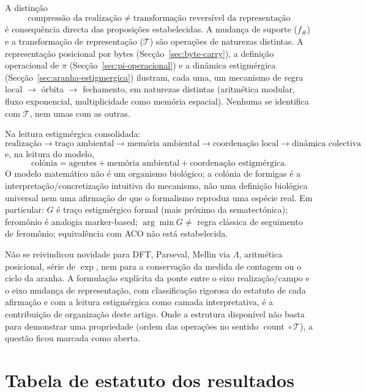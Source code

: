 \documentclass[11pt,a4paper]{article}
\begin{document}
A distinção
\[
\text{compressão da realização}
\;\neq\;
\text{transformação reversível da representação}
\]
é consequência directa das proposições estabelecidas. A mudança de suporte (\(f_{\#}\)) e a transformação de representação (\(\mathcal T\)) são operações de naturezas distintas. A representação posicional por bytes (Secção~\ref{sec:byte-carry}), a definição operacional de \(\pi\) (Secção~\ref{sec:pi-operacional}) e a dinâmica estigmérgica (Secção~\ref{sec:aranha-estigmergica}) ilustram, cada uma, um mecanismo de regra local \(\to\) órbita \(\to\) fechamento, em naturezas distintas (aritmética modular, fluxo exponencial, multiplicidade como memória espacial). Nenhuma se identifica com \(\mathcal T\), nem umas com as outras.

Na leitura estigmérgica consolidada:
\[
\boxed{\text{realização}\to\text{traço ambiental}\to\text{memória ambiental}\to\text{coordenação local}\to\text{dinâmica colectiva}},
\]
e, na leitura do modelo,
\[
\boxed{\text{colónia}=\text{agentes}+\text{memória ambiental}+\text{coordenação estigmérgica}}.
\]
O modelo matemático não é um organismo biológico; a colónia de formigas é a interpretação/concretização intuitiva do mecanismo, não uma definição biológica universal nem uma afirmação de que o formalismo reproduz uma espécie real. Em particular: \(G\) é traço estigmérgico formal (mais próximo da sematectónica); feromônio é analogia marker-based; \(\arg\min G\neq\) regra clássica de seguimento de feromônio; equivalência com ACO não está estabelecida.

Não se reivindicou novidade para DFT, Parseval, Mellin via \(\Lambda\), aritmética posicional, série de \(\exp\), nem para a conservação da medida de contagem ou o ciclo da aranha. A formulação explícita da ponte entre o eixo realização/campo e o eixo mudança de representação, com classificação rigorosa do estatuto de cada afirmação e com a leitura estigmérgica como camada interpretativa, é a contribuição de organização deste artigo. Onde a estrutura disponível não basta para demonstrar uma propriedade (ordem das operações no sentido \(\operatorname{count}\circ\mathcal T\)), a questão ficou marcada como aberta.

\section{Tabela de estatuto dos resultados}
\end{document}
